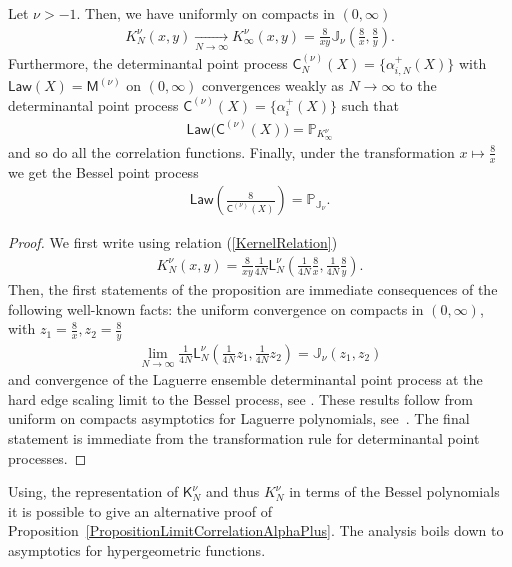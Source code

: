 \begin{Proposition}\label{PropositionLimitCorrelationAlphaPlus}
Let $\nu>-1$. Then, we have uniformly on compacts in $(0,\infty)$
\begin{gather*}
K_N^{\nu}(x,y)\underset{N\to \infty}{\longrightarrow}K_\infty^{\nu}(x,y)=\frac{8}{xy}\mathbb{J}_{\nu}\left(\frac{8}{x},\frac{8}{y}\right).
\end{gather*}
Furthermore, the determinantal point process $\mathsf{C}^{(\nu)}_{N}(X)=\{\alpha_{i,N}^+(X) \}$ with $\mathsf{Law}(X)=\mathsf{M}^{(\nu)}$ on $(0,\infty)$ convergences weakly as $N \to \infty$ to the determinantal point process $\mathsf{C}^{(\nu)}(X)=\{ \alpha_{i}^+(X) \}$ such that
\begin{gather*}
\mathsf{Law}\big(\mathsf{C}^{(\nu)}(X)\big)=\mathbb{P}_{K_{\infty}^{\nu}}
\end{gather*}
and so do all the correlation functions.
Finally, under the transformation $x \mapsto \frac{8}{x}$ we get the Bessel point process
\begin{gather*}
\mathsf{Law}\left(\frac{8}{\mathsf{C}^{(\nu)}(X)}\right)=\mathbb{P}_{\mathbb{J}_{\nu}}.
\end{gather*}
\end{Proposition}

\begin{proof}
We first write using relation (\ref{KernelRelation})
\begin{gather*}
K_N^{\nu}(x,y)=\frac{8}{xy}\frac{1}{4N}\mathsf{L}_{N}^{\nu}\left(\frac{1}{4N}\frac{8}{x},\frac{1}{4N}\frac{8}{y}\right).
\end{gather*}
Then, the first statements of the proposition are immediate consequences of the following well-known facts: the uniform convergence on compacts in $(0,\infty)$, with $z_1=\frac{8}{x}, z_2=\frac{8}{y}$
\begin{gather*}
\lim_{N \to \infty}\frac{1}{4N}\mathsf{L}_N^{\nu}\left(\frac{1}{4N}z_1,\frac{1}{4N}z_2\right)=\mathbb{J}_{\nu}(z_1,z_2)
\end{gather*}
and convergence of the Laguerre ensemble determinantal point process at the hard edge scaling limit to the Bessel process, see \cite{ForresterBessel,Forrester, TracyWidom}. These results follow from uniform on compacts asymptotics for Laguerre polynomials, see~\cite{Szego}. The final statement is immediate from the transformation rule for determinantal point processes.
\end{proof}

\begin{Remark}Using, the representation of $\mathsf{K}_N^{\nu}$ and thus $K_N^\nu$ in terms of the Bessel polynomials it is possible to give an alternative proof of Proposition~\ref{PropositionLimitCorrelationAlphaPlus}. The analysis boils down to asymptotics for hypergeometric functions.
\end{Remark}

